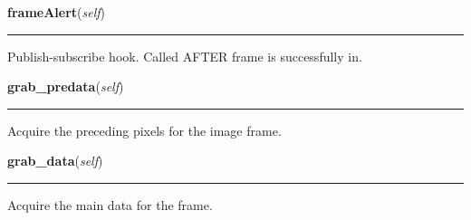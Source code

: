     \label{ociw:RawFrame:frameAlert}

    \vspace{0.5ex}

    \begin{boxedminipage}{\textwidth}

    \raggedright \textbf{frameAlert}(\textit{self})

    \vspace{-1.5ex}

    \rule{\textwidth}{0.5\fboxrule}
    Publish-subscribe hook. Called AFTER frame is successfully in.

    \vspace{1ex}

    \end{boxedminipage}

    \label{ociw:RawFrame:grab_predata}

    \vspace{0.5ex}

    \begin{boxedminipage}{\textwidth}

    \raggedright \textbf{grab\_predata}(\textit{self})

    \vspace{-1.5ex}

    \rule{\textwidth}{0.5\fboxrule}
    Acquire the preceding pixels for the image frame.

    \vspace{1ex}

    \end{boxedminipage}

    \label{ociw:RawFrame:grab_data}

    \vspace{0.5ex}

    \begin{boxedminipage}{\textwidth}

    \raggedright \textbf{grab\_data}(\textit{self})

    \vspace{-1.5ex}

    \rule{\textwidth}{0.5\fboxrule}
    Acquire the main data for the frame.

    \vspace{1ex}

    \end{boxedminipage}

